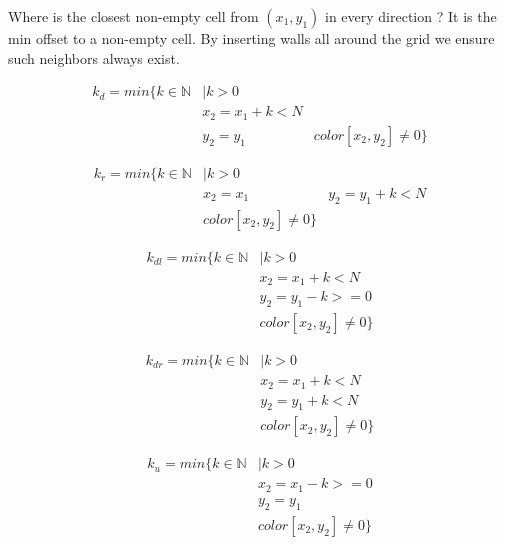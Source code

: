 \documentclass{article} %
\begin{document}
  Where is the closest non-empty cell from $(x_1, y_1)$ in every direction ? It is the min offset to a non-empty cell. By inserting walls all around the grid we ensure such neighbors always exist.

  \begin{align*}
    k_d = min \{ k \in \mathbb{N} & | k > 0 \\
                                  &   x_2 = x_1+k < N \\
                                  &   y_2 = y_1
                                  &   color[x_2, y_2] \ne 0 \}
  \end{align*}

  \begin{align*}
    k_r = min \{ k \in \mathbb{N} & | k > 0 \\
                                  &   x_2 = x_1
                                  &   y_2 = y_1+k < N \\
                                  &   color[x_2, y_2] \ne 0 \}
  \end{align*}

  \begin{align*}
    k_{dl} = min \{ k \in \mathbb{N} & | k > 0 \\
                                    &   x_2 = x_1+k < N \\
                                    &   y_2 = y_1-k >= 0 \\
                                    &   color[x_2, y_2] \ne 0 \}
  \end{align*}

  \begin{align*}
    k_{dr} = min \{ k \in \mathbb{N} & | k > 0 \\
                                    &   x_2 = x_1+k < N \\
                                    &   y_2 = y_1+k < N \\
                                    &   color[x_2, y_2] \ne 0 \}
  \end{align*}

  \begin{align*}
    k_u = min \{ k \in \mathbb{N} & | k > 0 \\
                                  &   x_2 = x_1-k >= 0 \\
                                  &   y_2 = y_1 \\
                                  &   color[x_2, y_2] \ne 0 \}
  \end{align*}
\end{document}
